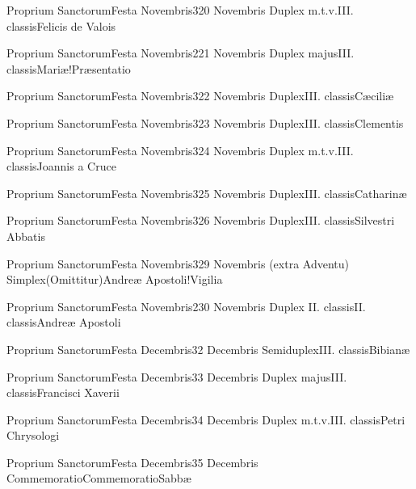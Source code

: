 \documentclass[psalterium-feriale.tex]{subfiles}
\begin{document}
	{Proprium Sanctorum}{Festa Novembris}{3}{20 Novembris}
	{Duplex m.t.v.}{III. classis}{Felicis de Valois}
	{}
	{}
\COPObRubric

	{Proprium Sanctorum}{Festa Novembris}{2}{21 Novembris}
	{Duplex majus}{III. classis}{Mariæ!Præsentatio}
	{\psalmodiapropria}
	{\CBMVRubric}

	{Proprium Sanctorum}{Festa Novembris}{3}{22 Novembris}
	{Duplex}{III. classis}{Cæciliæ}
	{}
	{}
\psalmodiapropria

	{Proprium Sanctorum}{Festa Novembris}{3}{23 Novembris}
	{Duplex}{III. classis}{Clementis}
	{}
	{}
\UMEXcRubric

	{Proprium Sanctorum}{Festa Novembris}{3}{24 Novembris}
	{Duplex m.t.v.}{III. classis}{Joannis a Cruce}
	{}
	{}
\COPObRubric

	{Proprium Sanctorum}{Festa Novembris}{3}{25 Novembris}
	{Duplex}{III. classis}{Catharinæ}
	{}
	{}
\MUVMbRubric

	{Proprium Sanctorum}{Festa Novembris}{3}{26 Novembris}
	{Duplex}{III. classis}{Silvestri Abbatis}
	{}
	{}
\COPObRubric

	{Proprium Sanctorum}{Festa Novembris}{3}{29 Novembris (extra Adventu)}
	{Simplex}{(Omittitur)}{Andreæ Apostoli!Vigilia}
	{}
	{}
\feriaRubric

	{Proprium Sanctorum}{Festa Novembris}{2}{30 Novembris}
	{Duplex II. classis}{II. classis}{Andreæ Apostoli}
	{}
	{}
\psalmodiapropria

	{Proprium Sanctorum}{Festa Decembris}{3}{2 Decembris}
	{Semiduplex}{III. classis}{Bibianæ}
	{}
	{}
\MUVMaRubric

	{Proprium Sanctorum}{Festa Decembris}{3}{3 Decembris}
	{Duplex majus}{III. classis}{Francisci Xaverii}
	{}
	{}
\COPOcRubric

	{Proprium Sanctorum}{Festa Decembris}{3}{4 Decembris}
	{Duplex m.t.v.}{III. classis}{Petri Chrysologi}
	{}
	{}
\COPOcRubric

	{Proprium Sanctorum}{Festa Decembris}{3}{5 Decembris}
	{Commemoratio}{Commemoratio}{Sabbæ}
	{}
	{}
\feriaRubric
\end{document}
